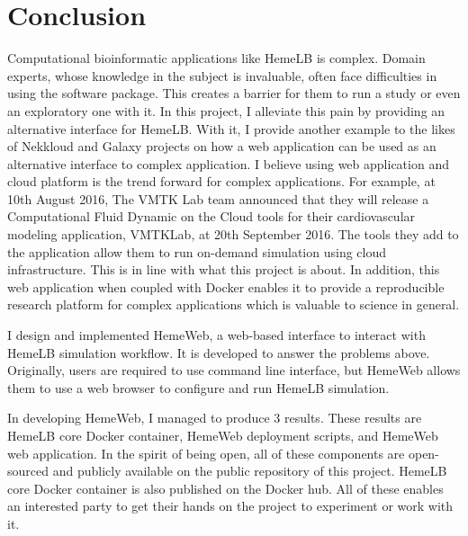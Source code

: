  

\chapter[Conclusion]{Conclusion}


Computational bioinformatic applications like HemeLB is complex. Domain experts, whose knowledge in the subject is invaluable, often face difficulties in using the software package. This creates a barrier for them to run a study or even an exploratory one with it. In this project, I  alleviate this pain by providing an alternative interface for HemeLB. With it, I provide another example to the likes of Nekkloud and Galaxy projects on how a web application can be used as an alternative interface to complex application. I believe using web application and cloud platform is the trend forward for complex applications. For example, at 10th August 2016, The VMTK Lab team announced that they will release a Computational Fluid Dynamic on the Cloud tools for their cardiovascular modeling application, VMTKLab, at 20th September 2016. The tools they add to the application allow them to run on-demand simulation using cloud infrastructure\citep{VMTKL63:online}. This is in line with what this project is about. In addition, this web application when coupled with Docker enables it to provide a reproducible research platform for complex applications which is valuable to science in general.


I design and implemented HemeWeb, a web-based interface to interact with HemeLB simulation workflow. It is developed to answer the problems above. Originally, users are required to use command line interface, but HemeWeb allows them to use a web browser to configure and run HemeLB simulation. 

In developing HemeWeb, I managed to produce 3 results. These results are HemeLB core Docker container, HemeWeb deployment scripts, and HemeWeb web application. In the spirit of being open, all of these components are open-sourced and publicly available on the public repository of this project. HemeLB core Docker container is also published on the Docker hub. All of these enables an interested party to get their hands on the project to experiment or work with it.

